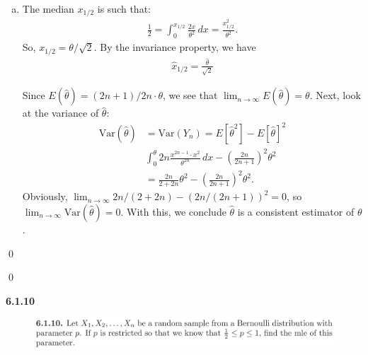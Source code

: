 \documentclass{book}
\theoremstyle{definition}
\newcommand{\nn}{\nonumber}
\newcommand{\Var}{\text{Var}}
\newcommand{\f}[2]{\frac{#1}{#2}}
\newcommand{\lp}{\left(}
\newcommand{\rp}{\right)}
\begin{document}
\begin{enumerate}[(a)]
	
	
	
	\item The median $x_{1/2}$ is such that:
	\begin{align}
	\f{1}{2} = \int^{x_{1/2}}_0 \f{2x}{\theta^2}\,dx = \f{x^2_{1/2}}{\theta^2}.
	\end{align}
	So, $x_{1/2} = \theta/\sqrt{2}$. By the invariance property, we have
	\begin{align}
	\boxed{\hat{x}_{1/2} = \f{\hat\theta}{\sqrt{2}}}
	\end{align}
	
	Since $E(\hat\theta) = (2n+1)/2n \cdot \theta$, we see that $\lim_{n\to \infty} E(\hat\theta) = \theta$. Next, look at the variance of $\hat\theta$:
	\begin{align}
	\Var(\hat\theta) &= \Var(Y_n) = E[\hat\theta^2] - E[\hat\theta]^2 \nn\\
	& \int^\theta_0 2n \f{x^{2n-1}\cdot x^2}{\theta^{2n}}\,dx - \lp\f{2n}{2n+1}\rp^2\theta^2\nn\\
	&= \f{2n}{2+2n} \theta^2 - \lp\f{2n}{2n+1}\rp^2\theta^2.
	\end{align}
	Obviously, $\lim_{n\to \infty} 2n/(2+2n) - (2n/(2n+1))^2 = 0$, so $\lim_{n\to \infty}\Var(\hat\theta) = 0$. With this, we conclude $\hat\theta$ is a consistent estimator of $\theta$. 
	
	
	
\end{enumerate}\qed





\qed




\newpage
\noindent \textbf{6.1.10}
\begin{figure}[!htb]
	\centering
	\includegraphics[scale=0.25]{6110}
\end{figure}
\end{document}
